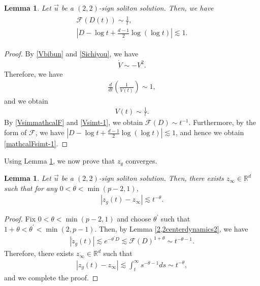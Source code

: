 \documentclass[10pt,a4paper]{amsart}
\newtheorem{lemma}[theorem]{Lemma}
\numberwithin{equation}{section}
\begin{document}
\begin{lemma}\label{Fsimt-1lem}
Let $\vec{u}$ be a $(2,2)$-sign soliton solution. Then, we have
\begin{align}\label{mathcalFsimt-1}
\begin{aligned}
\mathcal{F}(D(t))\sim \frac{1}{t},
\\
\left|D-\log{t}+\frac{d-1}{2}\log{(\log{t})}\right|\lesssim 1.
\end{aligned}
\end{align}
\end{lemma}
\begin{proof}
By \eqref{Vbibun} and \eqref{Sichiyou}, we have
\begin{align*}
\dot{V}\sim -V^2.
\end{align*}
Therefore, we have
\begin{align*}
\frac{d}{dt}\left(\frac{1}{V(t)}\right)\sim 1,
\end{align*}
and we obtain 
\begin{align}\label{Vsimt-1}
V(t)\sim \frac{1}{t}.
\end{align}
By \eqref{VsimmathcalF} and \eqref{Vsimt-1}, we obtain $\mathcal{F}(D)\sim t^{-1}$. Furthermore, by the form of $\mathcal{F}$, we have $|D-\log{t}+\frac{d-1}{2}\log{(\log{t})}|\lesssim 1$, and hence we obtain \eqref{mathcalFsimt-1}.
\end{proof}
Using Lemma \ref{Fsimt-1lem}, we now prove that $z_g$ converges.
\begin{lemma}\label{zgshusoku}
Let $\vec{u}$ be a $(2,2)$-sign soliton solution. Then, there exists $z_{\infty}\in \mathbb{R}^d$ such that for any $0<\theta<\min{(p-2,1)}$,
\begin{align}\label{jushines}
|z_g(t)-z_{\infty}|\lesssim t^{-\theta}.
\end{align}
\end{lemma}
\begin{proof}
Fix $0<\theta<\min{(p-2,1)}$ and choose $\theta^{\prime}$ such that $1+\theta<\theta^{\prime}<\min{(2,p-1)}$. Then, by Lemma \ref{2,2centerdynamics2}, we have
\begin{align*}
|\dot{z}_g(t)|\lesssim e^{-\theta^{\prime}D}\lesssim \mathcal{F}(D)^{1+\theta}\sim t^{-\theta-1}.
\end{align*}
Therefore, there exists $z_{\infty}\in \mathbb{R}^d$ such that 
\begin{align*}
|z_g(t)-z_{\infty}|\lesssim \int_t^{\infty} s^{-\theta-1}ds\sim t^{-\theta},
\end{align*}
and we complete the proof.
\end{proof}
\end{document}
